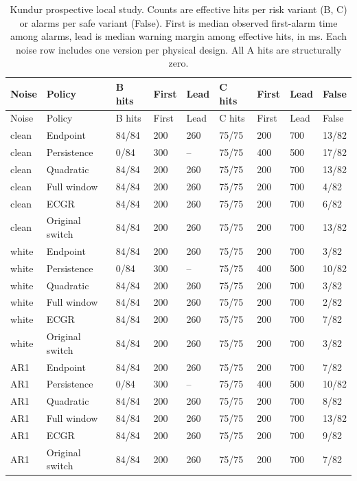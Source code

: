 \documentclass[10pt]{article}
\begin{document}
\begin{longtable}{@{}lllllllll@{}}
\caption{Kundur prospective local study. Counts are effective hits per risk variant (B, C) or alarms per safe variant (False). First is median observed first-alarm time among alarms, lead is median warning margin among effective hits, in ms. Each noise row includes one version per physical design. All A hits are structurally zero.}\label{tab:abskundur}\\
\toprule Noise & Policy & B hits & First & Lead & C hits & First & Lead & False \\\midrule\endfirsthead
\toprule Noise & Policy & B hits & First & Lead & C hits & First & Lead & False \\\midrule\endhead
clean & Endpoint & 84/84 & 200 & 260 & 75/75 & 200 & 700 & 13/82 \\
clean & Persistence & 0/84 & 300 & -- & 75/75 & 400 & 500 & 17/82 \\
clean & Quadratic & 84/84 & 200 & 260 & 75/75 & 200 & 700 & 13/82 \\
clean & Full window & 84/84 & 200 & 260 & 75/75 & 200 & 700 & 4/82 \\
clean & ECGR & 84/84 & 200 & 260 & 75/75 & 200 & 700 & 6/82 \\
clean & Original switch & 84/84 & 200 & 260 & 75/75 & 200 & 700 & 13/82 \\
white & Endpoint & 84/84 & 200 & 260 & 75/75 & 200 & 700 & 3/82 \\
white & Persistence & 0/84 & 300 & -- & 75/75 & 400 & 500 & 10/82 \\
white & Quadratic & 84/84 & 200 & 260 & 75/75 & 200 & 700 & 3/82 \\
white & Full window & 84/84 & 200 & 260 & 75/75 & 200 & 700 & 2/82 \\
white & ECGR & 84/84 & 200 & 260 & 75/75 & 200 & 700 & 7/82 \\
white & Original switch & 84/84 & 200 & 260 & 75/75 & 200 & 700 & 3/82 \\
AR1 & Endpoint & 84/84 & 200 & 260 & 75/75 & 200 & 700 & 7/82 \\
AR1 & Persistence & 0/84 & 300 & -- & 75/75 & 400 & 500 & 10/82 \\
AR1 & Quadratic & 84/84 & 200 & 260 & 75/75 & 200 & 700 & 8/82 \\
AR1 & Full window & 84/84 & 200 & 260 & 75/75 & 200 & 700 & 13/82 \\
AR1 & ECGR & 84/84 & 200 & 260 & 75/75 & 200 & 700 & 9/82 \\
AR1 & Original switch & 84/84 & 200 & 260 & 75/75 & 200 & 700 & 7/82 \\
\bottomrule\end{longtable}\endgroup\begingroup\footnotesize\setlength{\tabcolsep}{4pt}
\end{document}
